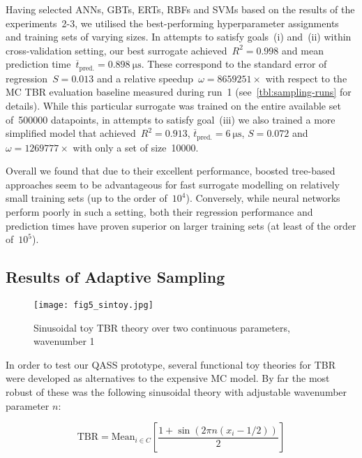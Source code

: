 Having selected ANNs, GBTs, ERTs, RBFs and SVMs based on the results of the
experiments~2-3, we utilised the best-performing hyperparameter
assignments and training sets of varying sizes. In attempts to satisfy
goals~(i) and~(ii) within cross-validation setting, our best surrogate
achieved~$R^2=\num{0.998}$ and mean prediction
time~$\overline{t}_{\text{pred.}}=\SI{0.898}{\micro\second}$. These correspond
to the standard error of regression~$S=\num{0.013}$ and a relative speedup~$\omega=\num{8659251} \times$
with respect to the MC TBR evaluation baseline measured during run~1
(see~\cref{tbl:sampling-runs} for details). While this particular surrogate
was trained on the entire available set of~\num{500000} datapoints, in attempts to satisfy
goal~(iii) we also trained a more simplified model that achieved~$R^2=\num{0.913}$,
$\overline{t}_{\text{pred.}}=\SI{6}{\micro\second}$, $S=\num{0.072}$ and $\omega=\num{1269777} \times$
with only a set of size~\num{10000}.

Overall we found that due to their excellent performance, boosted tree-based
approaches seem to be advantageous for fast surrogate modelling on relatively small training
sets (up to the order of~$10^4$). Conversely, while neural networks perform
poorly in such a setting, both their regression performance and prediction times
have proven superior on larger training sets (at least of the order of~$10^5$).


\subsection{Results of Adaptive Sampling}
\label{sec:adaptiveres}

\begin{wrapfigure}{r}{0.4\textwidth}
	\centering
	\texttt{[image: fig5\_sintoy.jpg]}
	\caption{Sinusoidal toy TBR theory over two continuous parameters, wavenumber 1}
	\label{fig:sintoy}
\end{wrapfigure}

In order to test our QASS prototype, several functional toy theories for TBR were developed as alternatives to the expensive MC model. By far the most robust of these was the following sinusoidal theory with adjustable wavenumber parameter $n$:

\begin{equation}
	\text{TBR} = \text{Mean}_{i \in C} \left[ \frac{1 + \sin(2\pi n (x_i - 1/2)) }{2} \right]
\end{equation}

